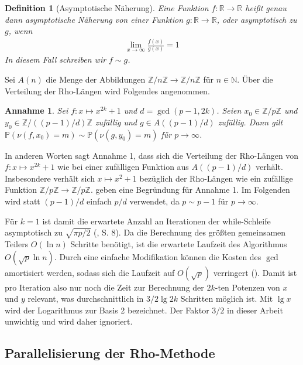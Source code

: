 \documentclass[a4paper, 10pt, ngerman]{article}
\newcommand{\N}{\mathbb{N}}
\newcommand{\R}{\mathbb{R}}
\newcommand{\Z}{\mathbb{Z}}
\renewcommand{\P}{\mathbb{P}}
\newtheorem{definition}{Definition}
\newtheorem{assumption}{Annahme}
\begin{document}
\begin{definition}[Asymptotische Näherung]
    Eine Funktion $f : \R \to \R$ heißt genau dann asymptotische Näherung von einer Funktion $g : \R \to \R$, oder asymptotisch zu $g$, wenn
    \begin{align*}
        \lim_{x \to \infty} \frac {f(x)} {g(x)} = 1
    \end{align*}
    In diesem Fall schreiben wir $f \sim g$.
\end{definition}

Sei $A(n)$ die Menge der Abbildungen $\Z/n\Z \to \Z/n\Z$ für $n \in \N$. Über die Verteilung der Rho-Längen wird Folgendes angenommen.

\begin{assumption}
    Sei $f : x \mapsto x^{2k} + 1$ und $d = \gcd(p - 1, 2k)$. Seien $x_0 \in \Z/p\Z$ und $y_0 \in \Z/((p - 1)/d)\Z$ zufällig und $g \in A((p - 1)/d)$ zufällig. Dann gilt $\P(\nu(f, x_0) = m) \sim \P(\nu(g, y_0) = m)$ für $p \to \infty$.
\end{assumption}

\noindent In anderen Worten sagt Annahme 1, dass sich die Verteilung der Rho-Längen von $f : x \mapsto x^{2k} + 1$ wie bei einer zufälligen Funktion aus $A((p - 1)/d)$ verhält. Insbesondere verhält sich $x \mapsto x^2 + 1$ bezüglich der Rho-Längen wie ein zufällige Funktion $\Z/p\Z \to \Z/p\Z$. \cite{bp81} geben eine Begründung für Annahme 1. Im Folgenden wird statt $(p - 1)/d$ einfach $p/d$ verwendet, da $p \sim p - 1$ für $p \to \infty$.

Für $k = 1$ ist damit die erwartete Anzahl an Iterationen der while-Schleife asymptotisch zu $\sqrt{\pi p / 2}$ (\cite{knu98}, S. 8). Da die Berechnung des größten gemeinsamen Teilers $O(\ln n)$ Schritte benötigt, ist die erwartete Laufzeit des Algorithmus $O(\sqrt p \ln n)$. Durch eine einfache Modifikation können die Kosten des $\gcd$ amortisiert werden, sodass sich die Laufzeit auf $O(\sqrt p)$ verringert (\cite{bre80}). Damit ist pro Iteration also nur noch die Zeit zur Berechnung der $2k$-ten Potenzen von $x$ und $y$ relevant, was durchschnittlich in $3/2 \lg 2k$ Schritten möglich ist. Mit $\lg x$ wird der Logarithmus zur Basis 2 bezeichnet. Der Faktor $3/2$ in dieser Arbeit unwichtig und wird daher ignoriert.

\subsection{Parallelisierung der Rho-Methode}\label{sec:par}
\end{document}
